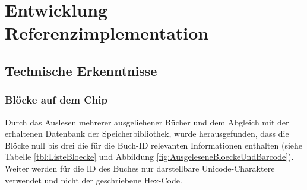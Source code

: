 \chapter{Entwicklung Referenzimplementation}

\section{Technische Erkenntnisse}

\subsection{Blöcke auf dem Chip}
Durch das Auslesen mehrerer ausgeliehener Bücher und dem Abgleich mit der erhaltenen Datenbank der Speicherbibliothek, wurde herausgefunden, dass die Blöcke null bis drei die für die Buch-ID relevanten Informationen enthalten (siehe Tabelle \ref{tbl:ListeBloecke} und Abbildung \ref{fig:AusgeleseneBloeckeUndBarcode}). Weiter werden für die ID des Buches nur darstellbare Unicode-Charaktere verwendet und nicht der geschriebene Hex-Code.

